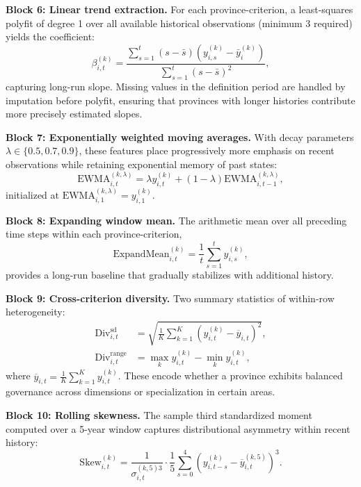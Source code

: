\documentclass[12pt,a4paper]{article}
\begin{document}
\textbf{Block 6: Linear trend extraction.} For each province-criterion, a least-squares polyfit of degree 1 over all available historical observations (minimum 3 required) yields the coefficient:
\begin{equation}
\beta_{i,t}^{(k)} = \frac{\sum_{s=1}^{t} (s - \bar{s})(y_{i,s}^{(k)} - \bar{y}_{i}^{(k)})}{\sum_{s=1}^{t} (s - \bar{s})^2},
\end{equation}
capturing long-run slope. Missing values in the definition period are handled by imputation before polyfit, ensuring that provinces with longer histories contribute more precisely estimated slopes.

\textbf{Block 7: Exponentially weighted moving averages.} With decay parameters $\lambda \in \{0.5, 0.7, 0.9\}$, these features place progressively more emphasis on recent observations while retaining exponential memory of past states:
\begin{equation}
\text{EWMA}_{i,t}^{(k,\lambda)} = \lambda y_{i,t}^{(k)} + (1-\lambda) \text{EWMA}_{i,t-1}^{(k,\lambda)},
\end{equation}
initialized at $\text{EWMA}_{i,1}^{(k,\lambda)} = y_{i,1}^{(k)}$.

\textbf{Block 8: Expanding window mean.} The arithmetic mean over all preceding time steps within each province-criterion,
\begin{equation}
\text{ExpandMean}_{i,t}^{(k)} = \frac{1}{t} \sum_{s=1}^{t} y_{i,s}^{(k)},
\end{equation}
provides a long-run baseline that gradually stabilizes with additional history.

\textbf{Block 9: Cross-criterion diversity.} Two summary statistics of within-row heterogeneity:
\begin{align}
\text{Div}_{i,t}^{\text{sd}} &= \sqrt{\frac{1}{K} \sum_{k=1}^{K} (y_{i,t}^{(k)} - \overline{y}_{i,t})^2}, \\
\text{Div}_{i,t}^{\text{range}} &= \max_{k} y_{i,t}^{(k)} - \min_{k} y_{i,t}^{(k)},
\end{align}
where $\overline{y}_{i,t} = \frac{1}{K} \sum_{k=1}^{K} y_{i,t}^{(k)}$. These encode whether a province exhibits balanced governance across dimensions or specialization in certain areas.

\textbf{Block 10: Rolling skewness.} The sample third standardized moment computed over a 5-year window captures distributional asymmetry within recent history:
\begin{equation}
\text{Skew}_{i,t}^{(k)} = \frac{1}{\sigma_{i,t}^{(k,5)3}} \cdot \frac{1}{5} \sum_{s=0}^{4} (y_{i,t-s}^{(k)} - \overline{y}_{i,t}^{(k,5)})^3.
\end{equation}
\end{document}
